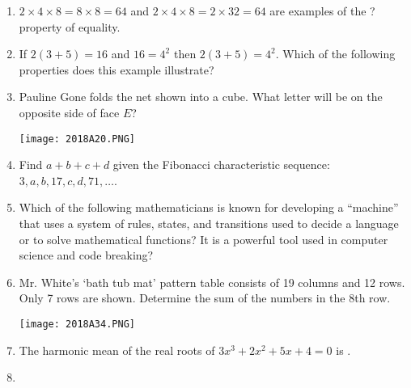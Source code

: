 \documentclass[../uilmath.tex]{subfiles}
\begin{document}
\begin{enumerate}[label=\bfseries\arabic*.]
    \item %
    $2\times 4\times 8 = 8\times 8 = 64$ and $2\times 4\times 8 = 2\times 32 = 64$ are examples of the ? property of equality.

    \item %
    If $2(3+5)=16$ and $16=4^2$ then $2(3+5)=4^2$. Which of the following properties does this example illustrate?

    \item %
    Pauline Gone folds the net shown into a cube. What letter will be on the opposite side of face $E$?
    \begin{center}
        \texttt{[image: 2018A20.PNG]}
    \end{center}

    \item %
    Find $a+b+c+d$ given the Fibonacci characteristic sequence: $3,a,b,17,c,d,71,\dots$.

    \item %
    Which of the following mathematicians is known for developing a ``machine'' that uses a system of rules, states, and transitions 
    used to decide a language or to solve mathematical functions? It is a powerful tool used in computer science and code breaking?

    \item %
    Mr. White's `bath tub mat' pattern table consists of 19 columns and 12 rows. Only 7 rows are shown. Determine the sum of the numbers in the 8th row.
    \begin{center}
        \texttt{[image: 2018A34.PNG]}
    \end{center}

    \item %
    The harmonic mean of the real roots of $3x^3+2x^2+5x+4=0$ is \blank .

    \item %
    
\end{enumerate}
\end{document}
